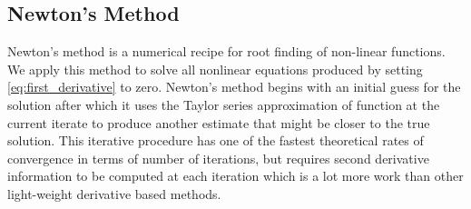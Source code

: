 \documentclass[12pt]{article}
\newcommand{\bS}[1] {\boldsymbol  #1}
\begin{document}
%
%

\subsection*{Newton's Method}\label{sec:Newton}
Newton's method is a numerical recipe for root finding of non-linear functions. We apply this method to solve all nonlinear equations produced by setting  \eqref{eq:first_derivative} to zero. Newton's method begins with an initial guess  for the solution after which it uses the Taylor series approximation of function at the current iterate to produce another estimate that might be closer to the true solution. This iterative procedure has one of the fastest theoretical rates of convergence in terms of number of iterations, but requires second derivative information to be computed at each iteration which is a lot more work than other light-weight derivative based methods.
\end{document}
